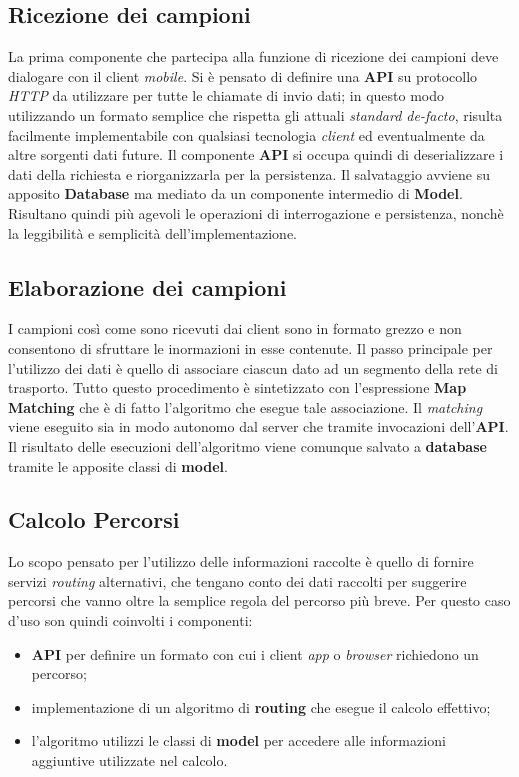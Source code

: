 \subsection{Ricezione dei campioni}
La prima componente che partecipa alla funzione di ricezione dei campioni deve dialogare con il client \emph{mobile}. Si è pensato di definire una \textbf{API} su protocollo \emph{HTTP} da utilizzare per tutte le chiamate di invio dati; in questo modo utilizzando un formato semplice che rispetta gli attuali \emph{standard de-facto}, risulta facilmente implementabile con qualsiasi tecnologia \emph{client} ed eventualmente da altre sorgenti dati future. Il componente \textbf{API} si occupa quindi di deserializzare i dati della richiesta e riorganizzarla per la persistenza. Il salvataggio avviene su apposito \textbf{Database} ma mediato da un componente intermedio di \textbf{Model}. Risultano quindi più agevoli le operazioni di interrogazione e persistenza, nonchè la leggibilità e semplicità dell'implementazione.

\subsection{Elaborazione dei campioni}
I campioni così come sono ricevuti dai client sono in formato grezzo e non consentono di sfruttare le inormazioni in esse contenute. Il passo principale per l'utilizzo dei dati è quello di associare ciascun dato ad un segmento della rete di trasporto. Tutto questo procedimento è sintetizzato con l'espressione \textbf{Map Matching} che è di fatto l'algoritmo che esegue tale associazione. Il \emph{matching} viene eseguito sia in modo autonomo dal server che tramite invocazioni dell'\textbf{API}. Il risultato delle esecuzioni dell'algoritmo viene comunque salvato a \textbf{database} tramite le apposite classi di \textbf{model}.

\subsection{Calcolo Percorsi}
Lo scopo pensato per l'utilizzo delle informazioni raccolte è quello di fornire servizi \emph{routing} alternativi, che tengano conto dei dati raccolti per suggerire percorsi che vanno oltre la semplice regola del percorso più breve. Per questo caso d'uso son quindi coinvolti i componenti:
\begin{itemize}
\item \textbf{API} per definire un formato con cui i client \emph{app} o \emph{browser} richiedono un percorso;
\item implementazione di un algoritmo di \textbf{routing} che esegue il calcolo effettivo;
\item l'algoritmo utilizzi le classi di \textbf{model} per accedere alle informazioni aggiuntive utilizzate nel calcolo.
\end{itemize}

